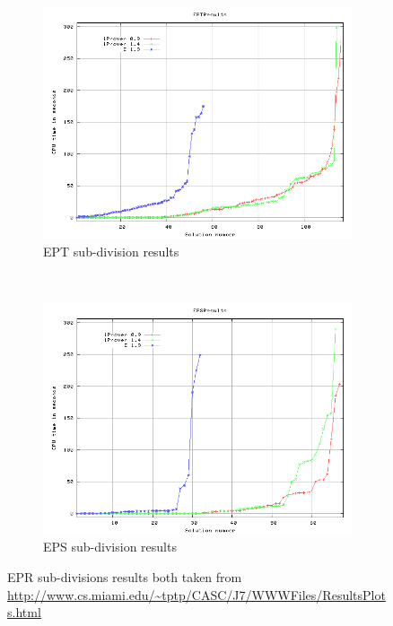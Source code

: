 \begin{figure}[H]
    \centering
    \begin{subfigure}[H]{\textwidth}
        \centering
        \includegraphics[scale=0.5]{pictures/EPTResults-Proof-Time.png}
        \caption{EPT sub-division results \label{fig:ept_casc_results}}
    \end{subfigure}
    ~ 
    \begin{subfigure}[H]{\textwidth}
        \centering
        \includegraphics[scale=0.5]{pictures/EPSResults-Proof-Time.png}
        \caption{EPS sub-division results \label{fig:eps_casc_results}}
    \end{subfigure}
    \caption{EPR sub-divisions results both taken from \url{http://www.cs.miami.edu/~tptp/CASC/J7/WWWFiles/ResultsPlots.html} \label{fig:epr_divisions_casc_results}}
\end{figure}


